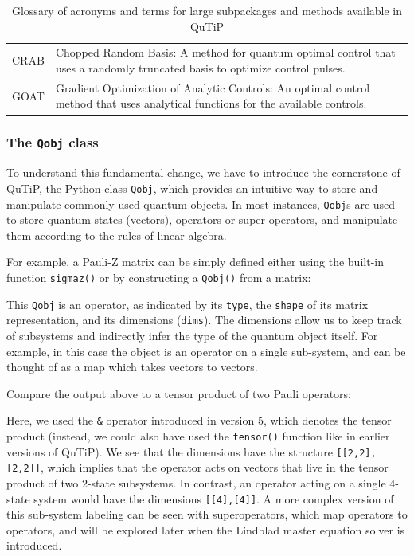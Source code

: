 \documentclass[preprint,3p,sort&compress]{elsarticle}
\def\code#1{\texttt{#1}}
\begin{document}
\begin{table}[ht]
\begin{tabular}{@{}lp{12cm}@{}}
        CRAB & Chopped Random Basis: A method for quantum optimal control that uses a randomly truncated basis to optimize control pulses. \\
   
        GOAT & Gradient Optimization of Analytic Controls: An optimal control method that uses analytical functions for the available controls. \\
        \bottomrule
    \end{tabular}
    \caption{Glossary of acronyms and terms for large subpackages and methods available in QuTiP}
    \label{tab:glossary_terms}
\end{table}



\subsubsection{The \textup{\code{Qobj}} class}
To understand this fundamental change, we have to introduce the cornerstone of QuTiP, the Python class \code{Qobj}, which provides an intuitive way to store and manipulate commonly used quantum objects.  In most instances, \code{Qobj}s are used to store quantum states (vectors), operators or super-operators, and manipulate them according to the rules of linear algebra. 

For example, a Pauli-Z matrix can be simply defined either using the built-in function \code{sigmaz()} or by constructing a \code{Qobj()} from a matrix: 

%
This \code{Qobj} is an operator, as indicated by its \code{type}, the \code{shape} of its matrix representation, and its dimensions (\code{dims}).  The dimensions allow us to keep track of subsystems and indirectly infer the type of the quantum object itself.  For example, in this case the object is an operator on a single sub-system, and can be thought of as a map which takes vectors to vectors.
\newpage 

Compare the output above to a tensor product of two Pauli operators:

%
Here, we used the \code{\&} operator introduced in version 5, which denotes the tensor product (instead, we could also have used the \code{tensor()} function like in earlier versions of QuTiP).  We see that the dimensions have the structure \code{[[2,2],[2,2]]}, which implies that the operator acts on vectors that live in the tensor product of two $2$-state subsystems.  In contrast, an operator acting on a single 4-state system would have the dimensions \code{[[4],[4]]}.  A more complex version of this sub-system labeling can be seen with superoperators, which map operators to operators, and will be explored later when the Lindblad master equation solver is introduced.
\end{document}
